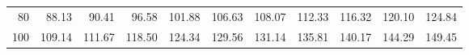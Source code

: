 \begin{center}
\begin{minipage}{5in}
\begin{center}
\begin{tabular}{|r|rrrrrrrrrr|}
\\\cellcolor{lightgray}	80	&\cellcolor{lightgray}	88.13	&\cellcolor{lightgray}	90.41	&\cellcolor{lightgray}	96.58	&\cellcolor{lightgray}	101.88	&\cellcolor{lightgray}	106.63	&\cellcolor{lightgray}	108.07	&\cellcolor{lightgray}	112.33	&\cellcolor{lightgray}	116.32	&\cellcolor{lightgray}	120.10	&\cellcolor{lightgray}	124.84
\\\cellcolor{lightgray}	100	&\cellcolor{lightgray}	109.14	&\cellcolor{lightgray}	111.67	&\cellcolor{lightgray}	118.50	&\cellcolor{lightgray}	124.34	&\cellcolor{lightgray}	129.56	&\cellcolor{lightgray}	131.14	&\cellcolor{lightgray}	135.81	&\cellcolor{lightgray}	140.17	&\cellcolor{lightgray}	144.29	&\cellcolor{lightgray}	149.45 \\ \hline 

\end{tabular}
\end{center}
\end{minipage}
\end{center}